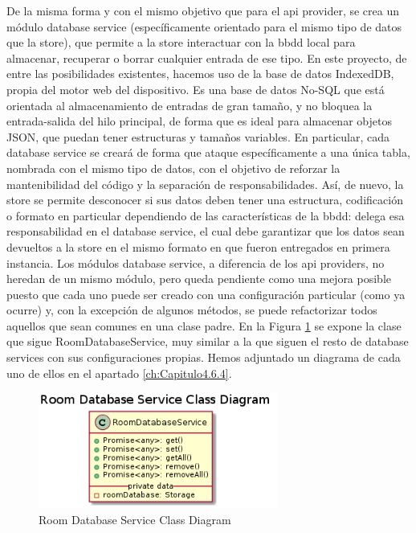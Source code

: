 \vspace{1cm}

De la misma forma y con el mismo objetivo que para el api provider, se crea un módulo database service (específicamente orientado para el mismo tipo de datos que la store), que permite a la store interactuar con la \gls{bbdd} local para almacenar, recuperar o borrar cualquier entrada de ese tipo. En este proyecto, de entre las posibilidades existentes, hacemos uso de la base de datos IndexedDB, propia del motor web del dispositivo. Es una base de datos No-SQL que está orientada al almacenamiento de entradas de gran tamaño, y no bloquea la entrada-salida del hilo principal, de forma que es ideal para almacenar objetos JSON, que puedan tener estructuras y tamaños variables. En particular, cada database service se creará de forma que ataque específicamente a una única tabla, nombrada con el mismo tipo de datos, con el objetivo de reforzar la mantenibilidad del código y la separación de responsabilidades. Así, de nuevo, la store se permite desconocer si sus datos deben tener una estructura, codificación o formato en particular dependiendo de las características de la \gls{bbdd}: delega esa responsabilidad en el database service, el cual debe garantizar que los datos sean devueltos a la store en el mismo formato en que fueron entregados en primera instancia. 
Los módulos database service, a diferencia de los api providers, no heredan de un mismo módulo, pero queda pendiente como una mejora posible puesto que cada uno puede ser creado con una configuración particular (como ya ocurre) y, con la excepción de algunos métodos, se puede refactorizar todos aquellos que sean comunes en una clase padre. En la Figura \ref{fig:database-service} se expone la clase que sigue RoomDatabaseService, muy similar a la que siguen el resto de database services con sus configuraciones propias. Hemos adjuntado un diagrama de cada uno de ellos en el apartado \ref{ch:Capitulo4.6.4}.


\begin{figure}[hbt!]
\centering
\includegraphics[height=1.5in]{figures/diagrams/front/architecture/database-service.png}
\caption[app-data]{Room Database Service Class Diagram\footnotemark}
\label{fig:database-service}
\end{figure}

